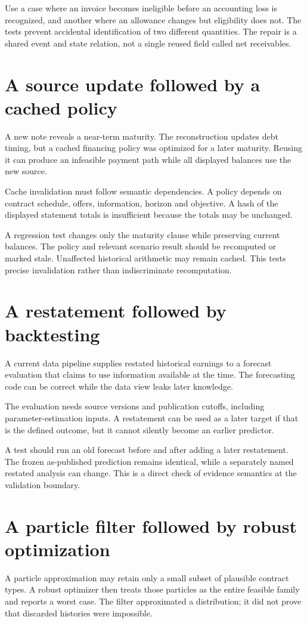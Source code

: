 Use a case where an invoice becomes ineligible before an accounting loss is recognized, and another where an allowance changes but eligibility does not. The tests prevent accidental identification of two different quantities. The repair is a shared event and state relation, not a single reused field called net receivables.

\section{A source update followed by a cached policy}
A new note reveals a near-term maturity. The reconstruction updates debt timing, but a cached financing policy was optimized for a later maturity. Reusing it can produce an infeasible payment path while all displayed balances use the new source.

Cache invalidation must follow semantic dependencies. A policy depends on contract schedule, offers, information, horizon and objective. A hash of the displayed statement totals is insufficient because the totals may be unchanged.

A regression test changes only the maturity clause while preserving current balances. The policy and relevant scenario result should be recomputed or marked stale. Unaffected historical arithmetic may remain cached. This tests precise invalidation rather than indiscriminate recomputation.

\section{A restatement followed by backtesting}
A current data pipeline supplies restated historical earnings to a forecast evaluation that claims to use information available at the time. The forecasting code can be correct while the data view leaks later knowledge.

The evaluation needs source versions and publication cutoffs, including parameter-estimation inputs. A restatement can be used as a later target if that is the defined outcome, but it cannot silently become an earlier predictor.

A test should run an old forecast before and after adding a later restatement. The frozen as-published prediction remains identical, while a separately named restated analysis can change. This is a direct check of evidence semantics at the validation boundary.

\section{A particle filter followed by robust optimization}
A particle approximation may retain only a small subset of plausible contract types. A robust optimizer then treats those particles as the entire feasible family and reports a worst case. The filter approximated a distribution; it did not prove that discarded histories were impossible.

